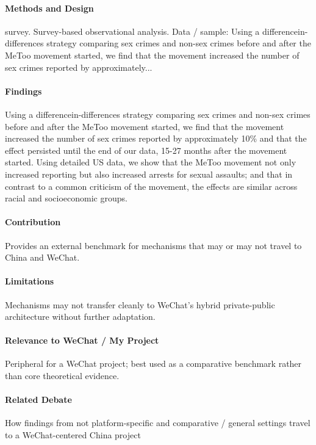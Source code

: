 \documentclass[12pt]{article}
\begin{document}
\paragraph{Methods and Design} survey. Survey-based observational analysis. Data / sample: Using a differencein-differences strategy comparing sex crimes and non-sex crimes before and after the MeToo movement started, we find that the movement increased the number of sex crimes reported by approximately...

\paragraph{Findings} Using a differencein-differences strategy comparing sex crimes and non-sex crimes before and after the MeToo movement started, we find that the movement increased the number of sex crimes reported by approximately 10\% and that the effect persisted until the end of our data, 15-27 months after the movement started. Using detailed US data, we show that the MeToo movement not only increased reporting but also increased arrests for sexual assaults; and that in contrast to a common criticism of the movement, the effects are similar across racial and socioeconomic groups.

\paragraph{Contribution} Provides an external benchmark for mechanisms that may or may not travel to China and WeChat.

\paragraph{Limitations} Mechanisms may not transfer cleanly to WeChat's hybrid private-public architecture without further adaptation.

\paragraph{Relevance to WeChat / My Project} Peripheral for a WeChat project; best used as a comparative benchmark rather than core theoretical evidence.

\paragraph{Related Debate} How findings from not platform-specific and comparative / general settings travel to a WeChat-centered China project
\end{document}
